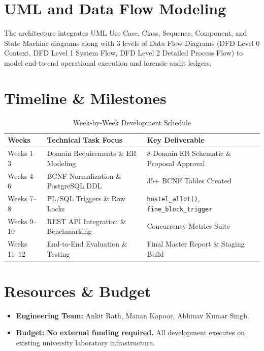 \documentclass[11pt,a4paper]{article}
\begin{document}
\section{UML and Data Flow Modeling}
The architecture integrates UML Use Case, Class, Sequence, Component, and State Machine diagrams along with 3 levels of Data Flow Diagrams (DFD Level 0 Context, DFD Level 1 System Flow, DFD Level 2 Detailed Process Flow) to model end-to-end operational execution and forensic audit ledgers.

\section{Timeline \& Milestones}
\begin{table}[h!]
\centering
\begin{tabular}{lll}
\toprule
\textbf{Weeks} & \textbf{Technical Task Focus} & \textbf{Key Deliverable} \\
\midrule
Weeks 1--3 & Domain Requirements \& ER Modeling & 8-Domain ER Schematic \& Proposal Approval \\
Weeks 4--6 & BCNF Normalization \& PostgreSQL DDL & 35+ BCNF Tables Created \\
Weeks 7--8 & PL/SQL Triggers \& Row Locks & \texttt{hostel\_allot()}, \texttt{fine\_block\_trigger} \\
Weeks 9--10 & REST API Integration \& Benchmarking & Concurrency Metrics Suite \\
Weeks 11--12 & End-to-End Evaluation \& Testing & Final Master Report \& Staging Build \\
\bottomrule
\end{tabular}
\caption{Week-by-Week Development Schedule}
\end{table}

\section{Resources \& Budget}
\begin{itemize}[leftmargin=*]
    \item \textbf{Engineering Team:} Ankit Rath, Manan Kapoor, Abhinav Kumar Singh.
    \item \textbf{Budget:} \textbf{No external funding required.} All development executes on existing university laboratory infrastructure.
\end{itemize}
\end{document}
